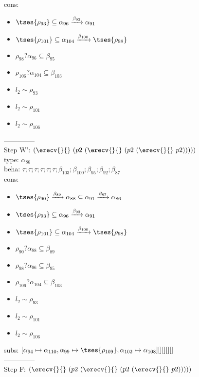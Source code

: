 \documentclass[12pt]{article}
\begin{document}
\\  cons: \begin{itemize}
\item $  \tses{ \rho_{93}} \subseteq \alpha_{96} \xrightarrow{\beta_{92}} \alpha_{91} $
\item $  \tses{ \rho_{101}} \subseteq \alpha_{104} \xrightarrow{\beta_{100}}  \tses{ \rho_{98}} $
\item $ \rho_{98}?\alpha_{96} \subseteq \beta_{95} $
\item $ \rho_{106}?\alpha_{104} \subseteq \beta_{103} $
\item $ l_{2} \sim\rho_{93} $
\item $ l_{2} \sim\rho_{101} $
\item $ l_{2} \sim\rho_{106} $
\end{itemize} 
  --------------\\ 
Step W': $ (\erecv{}{}~(p2~(\erecv{}{}~(p2~(\erecv{}{}~p2))))) $\\
  type: $ \alpha_{86} $ 
\\  beha: $ \tau; \tau; \tau; \tau; \tau; \tau; \beta_{103}; \beta_{100}; \beta_{95}; \beta_{92}; \beta_{87} $ 
\\  cons: \begin{itemize}
\item $  \tses{ \rho_{90}} \xrightarrow{\beta_{89}} \alpha_{88} \subseteq \alpha_{91} \xrightarrow{\beta_{87}} \alpha_{86} $
\item $  \tses{ \rho_{93}} \subseteq \alpha_{96} \xrightarrow{\beta_{92}} \alpha_{91} $
\item $  \tses{ \rho_{101}} \subseteq \alpha_{104} \xrightarrow{\beta_{100}}  \tses{ \rho_{98}} $
\item $ \rho_{90}?\alpha_{88} \subseteq \beta_{89} $
\item $ \rho_{98}?\alpha_{96} \subseteq \beta_{95} $
\item $ \rho_{106}?\alpha_{104} \subseteq \beta_{103} $
\item $ l_{2} \sim\rho_{93} $
\item $ l_{2} \sim\rho_{101} $
\item $ l_{2} \sim\rho_{106} $
\end{itemize} 
  subs:  $ [ \alpha_{94}\mapsto\alpha_{110}, \alpha_{99}\mapsto \tses{ \rho_{109}}, \alpha_{102}\mapsto\alpha_{108}] [] [] [] [] $  
 \\--------------\\ 
Step F: $ (\erecv{}{}~(p2~(\erecv{}{}~(p2~(\erecv{}{}~p2))))) $
\end{document}
